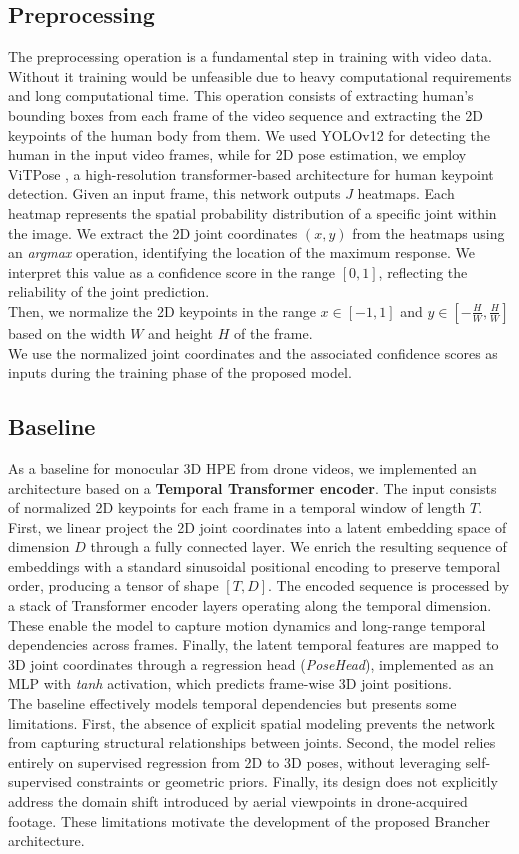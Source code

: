 \documentclass[11pt,a4paper,twocolumn]{article}
\begin{document}
\subsection{Preprocessing}
The preprocessing operation is a fundamental step in training with video data. Without it training would be unfeasible due to heavy computational requirements and long computational time.
This operation consists of extracting human's bounding boxes from each frame of the video sequence and extracting the 2D keypoints of the human body from them.
We used YOLOv12 for detecting the human in the input video frames, while for 2D pose estimation, we employ ViTPose \cite{xu2022vitpose}, a high-resolution transformer-based architecture for human keypoint detection.
Given an input frame, this network outputs $J$ heatmaps. Each heatmap represents the spatial probability distribution of a specific joint within the image.
We extract the 2D joint coordinates $(x,y)$ from the heatmaps using an \textit{argmax} operation, identifying the location of the maximum response. We interpret this value as a 
confidence score in the range $[0,1]$, reflecting the reliability of the joint prediction.\\
Then, we normalize the 2D keypoints in the range $x \in [-1, 1]$ and $y \in [-\frac{H}{W}, \frac{H}{W}]$ based on the width $W$ and height $H$ of the frame.\\
We use the normalized joint coordinates and the associated confidence scores as inputs during the training phase of the proposed model.

\subsection{Baseline}
As a baseline for monocular 3D HPE from drone videos, we implemented an architecture based on a \textbf{Temporal Transformer encoder}. The input consists of normalized 2D keypoints for each frame in a temporal 
window of length $T$. 
First, we linear project the 2D joint coordinates into a latent embedding space of dimension $D$ through a fully connected layer. 
We enrich the resulting sequence of embeddings with a standard sinusoidal positional encoding to preserve temporal order, producing a tensor of shape $[T,D]$. 
The encoded sequence is processed by a stack of Transformer encoder layers operating along the temporal dimension. These enable the model to capture motion dynamics and long-range temporal dependencies across frames.
Finally, the latent temporal features are mapped to 3D joint coordinates through a regression head (\textit{PoseHead}), implemented as an MLP with \textit{tanh} activation, which predicts frame-wise 3D joint positions.\\
The baseline effectively models temporal dependencies but presents some limitations. First, the absence of explicit spatial modeling prevents the 
network from capturing structural relationships between joints. Second, the model relies entirely on supervised regression from 2D to 3D poses, without 
leveraging self-supervised constraints or geometric priors. Finally, its design does not explicitly address the domain shift introduced by aerial viewpoints in 
drone-acquired footage.
These limitations motivate the development of the proposed Brancher architecture.
\end{document}
